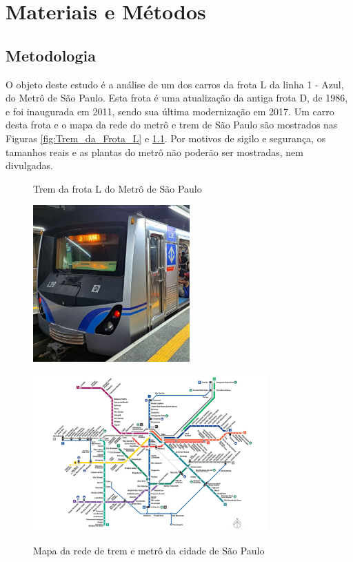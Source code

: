 \documentclass[acronym,symbols,table]{fei}
\begin{document}
\chapter{Materiais e Métodos}

\section{Metodologia}

O objeto deste estudo é a análise de um dos carros da frota L da linha 1 - Azul, do Metrô de São Paulo. Esta frota é uma atualização da antiga frota  D, de 1986, e foi inaugurada em 2011, sendo sua última modernização em 2017. Um carro desta frota e o mapa da rede do metrô e trem de São Paulo são mostrados nas Figuras \ref{fig:Trem_da_Frota_L} e \ref{fig:mapa-da-rede-metro-0124-abre}. Por motivos de sigilo e segurança, os tamanhos reais e as plantas do metrô não poderão ser mostradas, nem divulgadas.

\begin{figure}[!htb]
    \centering
    \begin{minipage}{0.45\textwidth}
        \caption{Trem da frota L do Metrô de São Paulo}
        \includegraphics[width=\linewidth, height=6cm]{Imagens/Alstom_L28.jpg}
        \label{fig:Trem_da_Frota_L}
    \end{minipage}\hfill
    \begin{minipage}{0.45\textwidth}
        \caption{Mapa da rede de trem e metrô da cidade de São Paulo}
        \includegraphics[width=\linewidth, height=6cm]{Imagens/mapa-da-rede-metro-0124-abre.jpg}
        \label{fig:mapa-da-rede-metro-0124-abre}
    \end{minipage}
\end{figure}
\end{document}
